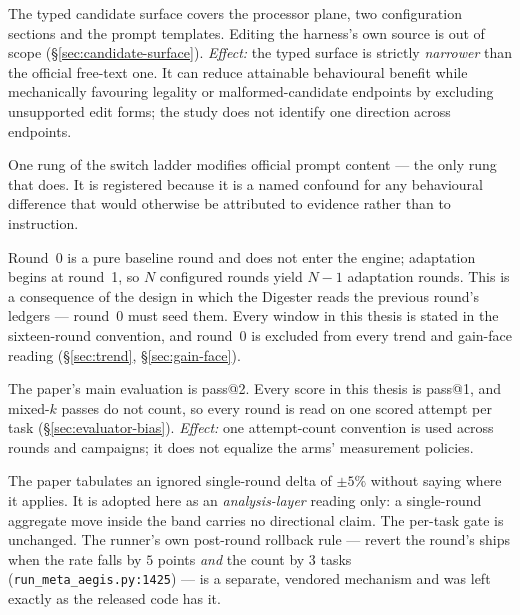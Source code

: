 \begin{description}[leftmargin=1.4em,style=nextline,itemsep=5pt]
  \item[\textnormal{\textbf{Edit-surface coverage.}}] The typed candidate
        surface covers the processor plane, two configuration sections and
        the prompt templates. Editing the harness's own source is out of
        scope (\S\ref{sec:candidate-surface}). \emph{Effect:} the typed surface is strictly \emph{narrower} than the official free-text
        one. It can reduce attainable behavioural benefit while mechanically
        favouring legality or malformed-candidate endpoints by excluding
        unsupported edit forms; the study does not identify one direction
        across endpoints.

  \item[\textnormal{\textbf{The registered L5 deviation.}}] One rung of the
        switch ladder modifies official prompt content --- the only rung
        that does. It is registered because it is a named confound for any
        behavioural difference that would otherwise be attributed to
        evidence rather than to instruction.

  \item[\textnormal{\textbf{Round indexing.}}] Round~0 is a pure baseline
        round and does not enter the engine; adaptation begins at round~1,
        so $N$ configured rounds yield $N-1$ adaptation rounds. This is a
        consequence of the design in which the Digester reads the previous
        round's ledgers --- round~0 must seed them. Every window in this
        thesis is stated in the sixteen-round convention, and round~0 is
        excluded from every trend and gain-face reading
        (\S\ref{sec:trend}, \S\ref{sec:gain-face}).

  \item[\textnormal{\textbf{pass@1 throughout.}}] The paper's main
        evaluation is pass@2. Every score in this thesis is pass@1, and
        mixed-$k$ passes do not count, so every round is read on one
        scored attempt per task (\S\ref{sec:evaluator-bias}).
        \emph{Effect:} one attempt-count convention is used across rounds and
        campaigns; it does not equalize the arms' measurement policies.

  \item[\textnormal{\textbf{The $\pm 5\%$ noise threshold.}}] The paper
        tabulates an ignored single-round delta of $\pm 5\%$ without saying
        where it applies. It is adopted here as an \emph{analysis-layer}
        reading only: a single-round aggregate move inside the band carries
        no directional claim. The per-task gate is unchanged. The runner's
        own post-round rollback rule --- revert the round's ships when the
        rate falls by $5$ points \emph{and} the count by $3$ tasks
        (\texttt{run\_meta\_aegis.py:1425}) --- is a separate,
        vendored mechanism and was left exactly as the released code has
        it.


\end{description}
